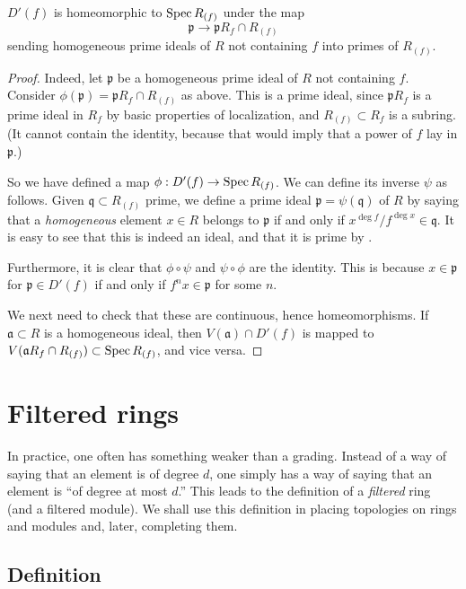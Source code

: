 \begin{proposition} 
$D'(f)$ is homeomorphic to $\operatorname{Spec} R_{(f)}$ under the map
\[  \mathfrak{p}  \to \mathfrak{p} R_f \cap R_{(f)}  \]
sending homogeneous prime ideals of $R$ not containing $f$ into primes of
$R_{(f)}$.
\end{proposition} 
\begin{proof} 
Indeed, let $\mathfrak{p}$ be a homogeneous prime ideal of $R$ not containing
$f$. Consider $\phi(\mathfrak{p}) = \mathfrak{p} R_f \cap R_{(f)} $ as above.
This is a prime ideal, since $\mathfrak{p}  R_f$ is a prime ideal in $R_f$ by
basic properties of localization, and $R_{(f)} \subset R_f$ is a subring. (It
cannot contain the identity, because that would imply that a power of $f$ lay
in $\mathfrak{p}$.)

So we have defined a map $\phi: D'(f) \to \operatorname{Spec} R_{(f)}$.  We can define its
inverse $\psi$ as follows. Given $\mathfrak{q} \subset R_{(f)} $ prime, we
define a
prime ideal $\mathfrak{p} = \psi(\mathfrak{q})$ of $R$ by saying that a
\textit{homogeneous} element $x \in
R$ belongs to $\mathfrak{p}$ if and only if $x^{\deg f}/f^{\deg x} \in
\mathfrak{q}$. It is easy to see that this is indeed an ideal, and that it is
prime by .

Furthermore, it is clear that $\phi \circ \psi $ and $\psi \circ \phi$ are the
identity.
This is because $x \in \mathfrak{p}$ for $\mathfrak{p} \in D'(f)$ if and only
if $f^n x \in \mathfrak{p}$ for some $n$.

We next need to check that these are continuous, hence homeomorphisms.  If
$\mathfrak{a} \subset R$ is a homogeneous ideal, then $V(\mathfrak{a}) \cap
D'(f)$ is
mapped to $V(\mathfrak{a}R_f \cap R_{(f)}) \subset \operatorname{Spec} R_{(f)}$, and vice
versa.
\end{proof} 

\section{Filtered rings}

In practice, one often has something weaker than a grading. Instead of a way
of saying that an element is of degree $d$, one simply has a way of saying
that an element is ``of degree at most $d$.'' This leads to the definition of a
\emph{filtered} ring (and a filtered module). We shall use this definition in
placing topologies on rings and modules and, later, completing them.

\subsection{Definition}

